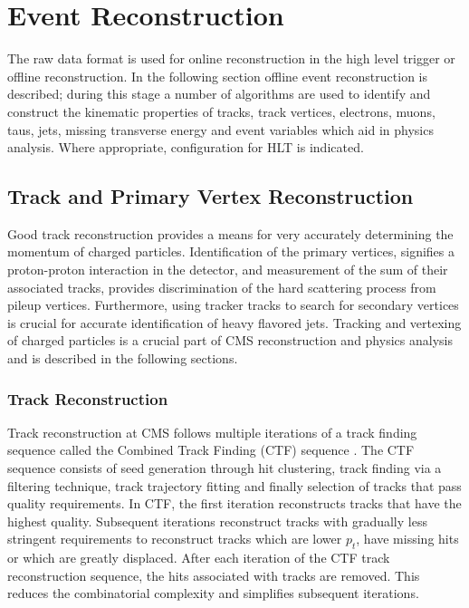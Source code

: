 \chapter{Event Reconstruction}
The raw data format 
is used for online reconstruction in the high level trigger
or offline reconstruction. 
In the following section offline event reconstruction is described;
during this stage a number of algorithms are used to identify and
construct the kinematic properties 
of tracks, track vertices,  electrons, muons, taus, jets, missing transverse energy and 
event variables which aid in physics analysis. Where appropriate, configuration
for HLT is indicated. 
\section{Track and Primary Vertex Reconstruction}
Good track reconstruction provides a means for very accurately determining
the momentum of charged particles.
Identification of the primary vertices, signifies a proton-proton interaction in the detector, and 
measurement of the sum of their associated tracks, 
provides discrimination of the hard scattering process 
from pileup vertices.
Furthermore, using tracker tracks to search for secondary vertices
is crucial for accurate identification of heavy flavored jets.
Tracking and vertexing of charged particles is a crucial part of CMS reconstruction
and physics analysis and is described in the following sections.
\subsection{Track Reconstruction}
\label{sec:TrackReco}
Track reconstruction at CMS follows multiple iterations of a track finding sequence
called the Combined Track Finding (CTF) sequence \cite{CMSTDRPhysics}. 
The CTF sequence consists of seed generation through hit clustering,
track finding via a filtering technique, track trajectory fitting and finally
selection of tracks that pass quality requirements. 
In CTF, the first iteration reconstructs tracks that
have the highest quality. Subsequent iterations reconstruct
tracks with gradually less stringent requirements 
to reconstruct tracks which are lower $p_{t}$, have missing hits or which are greatly displaced.
After each iteration of the CTF track reconstruction sequence, the hits
associated with tracks are removed. This reduces the combinatorial complexity
and simplifies subsequent iterations.%

